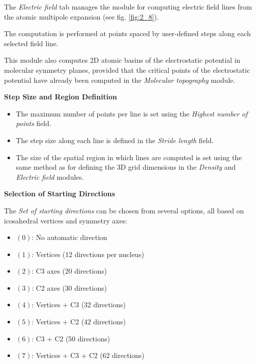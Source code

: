 \documentclass[10pt]{article}
\begin{document}
The {\it Electric field} tab manages the module for computing electric field lines
from the atomic multipole expansion (see fig. \ref{fig:2_8}).

The computation is performed at points spaced by user-defined steps
along each selected field line.

This module also computes 2D atomic basins
of the electrostatic potential in molecular symmetry planes,
provided that the critical points of the electrostatic potential
have already been computed in the {\it Molecular topography} module.

\vspace*{3mm}
{\bf Step Size and Region Definition}
\vspace*{3mm}

\begin{itemize}
\item The maximum number of points per line is set using the {\it Highest number of points} field.
\item The step size along each line is defined in the {\it Stride length} field.
\item The size of the spatial region in which lines are computed is set
using the same method as for defining the 3D grid dimensions
in the {\it Density} and {\it Electric field} modules.
\end{itemize}

\vspace*{3mm}
{\bf Selection of Starting Directions}
\vspace*{3mm}

The {\it Set of starting directions} can be chosen
from several options, all based on icosahedral vertices and symmetry axes:

\begin{itemize}
\item $(0)$: No automatic direction
\item $(1)$: Vertices (12 directions per nucleus)
\item $(2)$: C3 axes (20 directions)
\item $(3)$: C2 axes (30 directions)
\item $(4)$: Vertices + C3 (32 directions)
\item $(5)$: Vertices + C2 (42 directions)
\item $(6)$: C3 + C2 (50 directions)
\item $(7)$: Vertices + C3 + C2 (62 directions)
\end{itemize}
\end{document}
